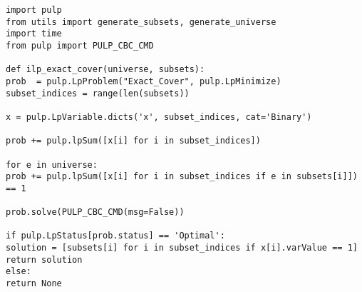 \documentclass{article}
\begin{document}
\begin{lstlisting}
import pulp
from utils import generate_subsets, generate_universe
import time
from pulp import PULP_CBC_CMD

def ilp_exact_cover(universe, subsets):
prob  = pulp.LpProblem("Exact_Cover", pulp.LpMinimize)
subset_indices = range(len(subsets))

x = pulp.LpVariable.dicts('x', subset_indices, cat='Binary')

prob += pulp.lpSum([x[i] for i in subset_indices])

for e in universe:
prob += pulp.lpSum([x[i] for i in subset_indices if e in subsets[i]]) == 1

prob.solve(PULP_CBC_CMD(msg=False))

if pulp.LpStatus[prob.status] == 'Optimal':
solution = [subsets[i] for i in subset_indices if x[i].varValue == 1]
return solution
else:
return None
\end{lstlisting}
\end{document}
